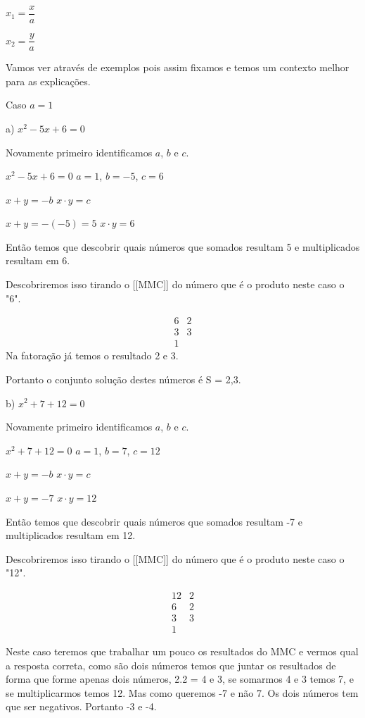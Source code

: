 \documentclass[letterpaper]{book}
\begin{document}
\(x_1 = \dfrac{x}{a}\)

\(x_2 = \dfrac{y}{a}\)

Vamos ver através de exemplos pois assim fixamos e temos um contexto melhor para as explicações.

 Caso \(a = 1\)

a) \(x^{2} - 5x + 6 = 0\)

Novamente primeiro identificamos \(a\), $b$ e $c$.

\(x^{2} - 5x + 6 = 0\)
\(a = 1\), $b = -5$, $c = 6$

\(x + y = -b\) 
\(x \cdot y = c\)

\(x + y = -(-5) = 5\)  
\(x \cdot y = 6\)

Então temos que descobrir quais números que somados resultam 5 e multiplicados resultam em 6.

Descobriremos isso tirando o [[MMC]] do número que é o produto neste caso o "6".

\[
\begin{array}{c|cc}
6 & 2 \\
3 & 3 \\
1
\end{array}
\]
Na fatoração já temos o resultado 2 e 3.

Portanto o conjunto solução destes números é S = {2,3}.

b) \(x^{2} + 7 + 12 = 0\)

Novamente primeiro identificamos \(a\), $b$ e $c$.

\(x^{2} + 7 + 12 = 0\)
\(a = 1\), $b = 7$, $c = 12$

\(x + y = -b\) 
\(x \cdot y = c\)

\(x + y = -7\)  
\(x \cdot y = 12\)

Então temos que descobrir quais números que somados resultam -7 e multiplicados resultam em 12.

Descobriremos isso tirando o [[MMC]] do número que é o produto neste caso o "12".

\[
\begin{array}{c|cc}
12 & 2 \\
6 & 2  \\
3 & 3  \\
1
\end{array}
\]

Neste caso teremos que trabalhar um pouco os resultados do MMC e vermos qual a resposta correta, como são dois números temos que juntar os resultados de forma que forme apenas dois números, 2.2 = 4 e 3, se somarmos 4 e 3 temos 7, e se multiplicarmos temos 12. Mas como queremos -7 e não 7. Os dois números tem que ser negativos. Portanto -3 e -4.
\end{document}
